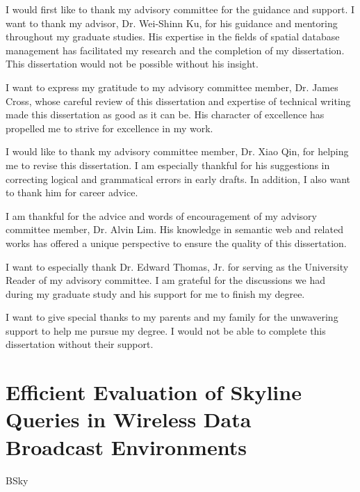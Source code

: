 \documentclass[12pt]{report}
\begin{document}
\begin{romanpages}
\begin{acknowledgments}

I would first like to thank my advisory committee for the guidance and support.
I want to thank my advisor, Dr. Wei-Shinn Ku, for his guidance and mentoring throughout my graduate studies. His expertise in the fields of spatial database management has facilitated my research and the completion of my dissertation. This dissertation would not be possible without his insight.

I want to express my gratitude to my advisory committee member, Dr. James Cross, whose careful review of this dissertation and expertise of technical writing made this dissertation as good as it can be. His character of excellence has propelled me to strive for excellence in my work.

I would like to thank my advisory committee member, Dr. Xiao Qin, for helping me to revise this dissertation. I am especially thankful for his suggestions in correcting logical and grammatical errors in early drafts. In addition, I also want to thank him for career advice.

I am thankful for the advice and words of encouragement of my advisory committee member, Dr. Alvin Lim. His knowledge in semantic web and related works has offered a unique perspective to ensure the quality of this dissertation.

I want to especially thank Dr. Edward Thomas, Jr. for serving as the University Reader of my advisory committee. I am grateful for the discussions we had during my graduate study and his support for me to finish my degree.

I want to give special thanks to my parents and my family for the unwavering support to help me pursue my degree. I would not be able to complete this dissertation without their support.
\end{acknowledgments}

\tableofcontents
\listoffigures
\listoftables
\end{romanpages}        %



\chapter{Efficient Evaluation of Skyline Queries in Wireless Data Broadcast Environments}
{BSky}
\end{document}
